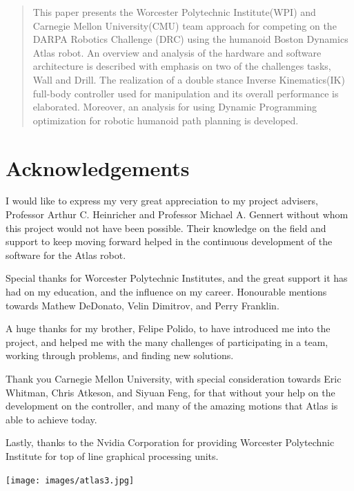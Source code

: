 \documentclass[12pt]{report}
\begin{document}
\setcounter{page}{1}
\begin{abstract}

This paper presents the Worcester Polytechnic Institute(WPI) and Carnegie Mellon University(CMU) team approach for competing on the DARPA Robotics Challenge (DRC) using the humanoid Boston Dynamics Atlas robot. An overview and analysis of the hardware and software architecture is described with emphasis on two of the challenges tasks, Wall and Drill. The realization of a double stance Inverse Kinematics(IK) full-body controller used for manipulation and its overall performance is elaborated. Moreover, an analysis for using Dynamic Programming optimization for robotic humanoid path planning is developed.


\end{abstract}

\newpage

\section*{Acknowledgements}
I would like to express my very great appreciation to my project advisers, Professor Arthur C. Heinricher and Professor Michael A. Gennert without whom this project would not have been possible. Their knowledge on the field and support to keep moving forward helped in the continuous development of the software for the Atlas robot. 

Special thanks for Worcester Polytechnic Institutes, and the great support it has had on my education, and the influence on my career. Honourable mentions towards Mathew DeDonato, Velin Dimitrov, and Perry Franklin. 

A huge thanks for my brother, Felipe Polido, to have introduced me into the project, and helped me with the many challenges of participating in a team, working through problems, and finding new solutions.

Thank you Carnegie Mellon University, with special consideration towards Eric Whitman, Chris Atkeson, and Siyuan Feng, for that without your help on the development on the controller, and many of the amazing motions that Atlas is able to achieve today. 

Lastly, thanks to the Nvidia Corporation for providing Worcester Polytechnic Institute for top of line graphical processing units. 

\newpage


\begin{center}
\texttt{[image: images/atlas3.jpg]}
\end{center}
\end{document}
